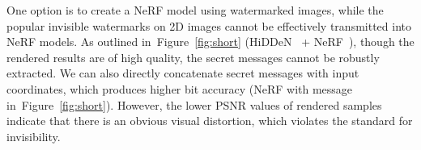 \documentclass[10pt,twocolumn,letterpaper]{article}
\def\eg{{\emph{e.g.}}}
\newcommand{\Fref}[1]{Figure~\ref{#1}}
\def\eg{\emph{e.g.}}
\def\eg{{\emph{e.g.}}}
\begin{document}



One option is to create a NeRF model using watermarked images, while the popular invisible watermarks on 2D images cannot be effectively transmitted into NeRF models. As outlined in~\Fref{fig:short} (HiDDeN~\cite{zhu2018hidden} + NeRF~\cite{nerf2020}), though the rendered results are of high quality, the secret messages cannot be robustly extracted. We can also directly concatenate secret messages with input coordinates, which produces higher bit accuracy (NeRF with message in~\Fref{fig:short}). However, the lower PSNR values of rendered samples indicate that there is an obvious visual distortion, which violates the standard for invisibility. 

\end{document}

